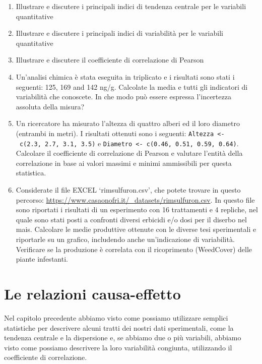 \documentclass[
  12pt,
]{book}
\providecommand{\tightlist}{%
  \setlength{\itemsep}{0pt}\setlength{\parskip}{0pt}}
\begin{document}
\begin{enumerate}
\def\labelenumi{\arabic{enumi}.}
\tightlist
\item
  Illustrare e discutere i principali indici di tendenza centrale per le variabili quantitative
\item
  Illustrare e discutere i principali indici di variabilità per le variabili quantitative
\item
  Illustrare e discutere il coefficiente di correlazione di Pearson
\item
  Un'analisi chimica è stata eseguita in triplicato e i risultati sono stati i seguenti: 125, 169 and 142 ng/g. Calcolate la media e tutti gli indicatori di variabilità che conoscete. In che modo può essere espressa l'incertezza assoluta della misura?
\item
  Un ricercatore ha misurato l'altezza di quattro alberi ed il loro diametro (entrambi in metri). I risultati ottenuti sono i seguenti: \texttt{Altezza\ \textless{}-\ c(2.3,\ 2.7,\ 3.1,\ 3.5)} e \texttt{Diametro\ \textless{}-\ c(0.46,\ 0.51,\ 0.59,\ 0.64)}. Calcolare il coefficiente di correlazione di Pearson e valutare l'entità della correlazione in base ai valori massimi e minimi ammissibili per questa statistica.
\item
  Considerate il file EXCEL `rimsulfuron.csv', che potete trovare in questo percorso: \url{https://www.casaonofri.it/_datasets/rimsulfuron.csv}. In questo file sono riportati i risultati di un esperimento con 16 trattamenti e 4 repliche, nel quale sono stati posti a confronti diversi erbicidi e/o dosi per il diserbo nel mais. Calcolare le medie produttive ottenute con le diverse tesi sperimentali e riportarle su un grafico, includendo anche un'indicazione di variabilità. Verificare se la produzione è correlata con il ricoprimento (WeedCover) delle piante infestanti.
\end{enumerate}

\hypertarget{le-relazioni-causa-effetto}{%
\chapter{Le relazioni causa-effetto}\label{le-relazioni-causa-effetto}}

Nel capitolo precedente abbiamo visto come possiamo utilizzare semplici statistiche per descrivere alcuni tratti dei nostri dati sperimentali, come la tendenza centrale e la dispersione e, se abbiamo due o più variabili, abbiamo visto come possiamo descrivere la loro variabilità congiunta, utilizzando il coefficiente di correlazione.
\end{document}
